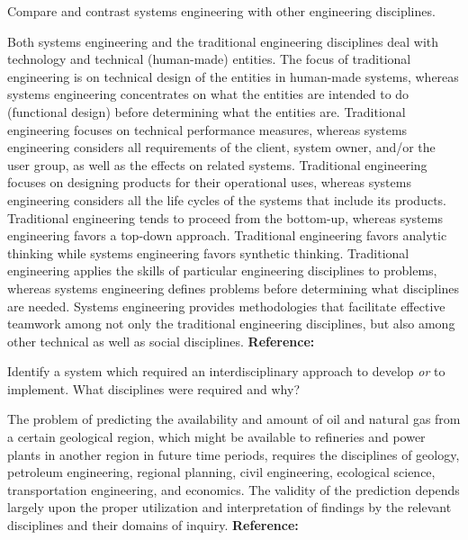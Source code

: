 \begin{exercises}
    \begin{exercise} 
    \label{sea-1-30}
        Compare and contrast systems engineering with other engineering disciplines.
    \end{exercise}
    \begin{solution}
        Both systems engineering and the traditional engineering disciplines deal with technology and technical (human-made) entities. The focus of traditional engineering is on technical design of the entities in human-made systems, whereas systems engineering concentrates on what the entities are intended to do (functional design) before determining what the entities are. Traditional engineering focuses on technical performance measures, whereas systems engineering considers all requirements of the client, system owner, and/or the user group, as well as the effects on related systems. Traditional engineering focuses on designing products for their operational uses, whereas systems engineering considers all the life cycles of the systems that include its products. Traditional engineering tends to proceed from the bottom-up, whereas systems engineering favors a top-down approach. Traditional engineering favors analytic thinking while systems engineering favors synthetic thinking. Traditional engineering applies the skills of particular engineering disciplines to problems, whereas systems engineering defines problems before determining what disciplines are needed. Systems engineering provides methodologies that facilitate effective teamwork among not only the traditional engineering disciplines, but also among other technical as well as social disciplines. \textbf{Reference:}
    \end{solution}
    
    \begin{exercise} 
    \label{sea-1-32}
        Identify a system which required an interdisciplinary approach to develop \textit{or} to implement. What disciplines were required and why?
    \end{exercise}
    \begin{solution}
        The problem of predicting the availability and amount of oil and natural gas from a certain geological region, which might be available to refineries and power plants in another region in future time periods, requires the disciplines of geology, petroleum engineering, regional planning, civil engineering, ecological science, transportation engineering, and economics. The validity of the prediction depends largely upon the proper utilization and interpretation of findings by the relevant disciplines and their domains of inquiry. \textbf{Reference:}
    \end{solution}
    

\end{exercises}
